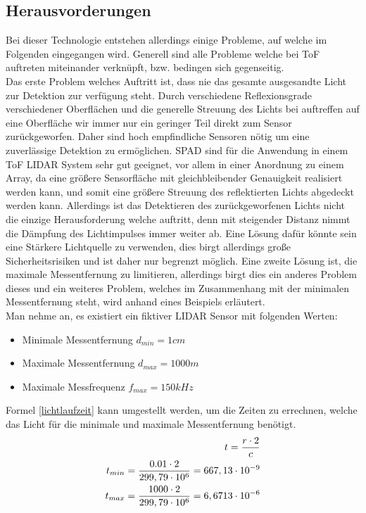 \subsection{Herausvorderungen}\label{subsec:tof_herausvorderungen}
Bei dieser Technologie entstehen allerdings einige Probleme, auf welche im Folgenden eingegangen wird. Generell sind alle Probleme welche bei \ac{ToF} auftreten miteinander verknüpft, bzw. bedingen sich gegenseitig. \\
Das erste Problem welches Auftritt ist, dass nie das gesamte ausgesandte Licht zur Detektion zur verfügung steht. Durch verschiedene Reflexionsgrade verschiedener Oberflächen und die generelle Streuung des Lichts bei auftreffen auf eine Oberfläche wir immer nur ein geringer Teil direkt zum Sensor zurückgeworfen. Daher sind hoch empfindliche Sensoren nötig um eine zuverlässige Detektion zu ermöglichen.
\ac{SPAD} sind für die Anwendung in einem \ac{ToF} \ac{LIDAR} System sehr gut geeignet, vor allem in einer Anordnung zu einem Array, da eine größere Sensorfläche mit gleichbleibender Genauigkeit realisiert werden kann, und somit eine größere Streuung des reflektierten Lichts abgedeckt werden kann. Allerdings ist das Detektieren des zurückgeworfenen Lichts nicht die einzige Herausforderung welche auftritt, denn mit steigender Distanz nimmt die Dämpfung des Lichtimpulses immer weiter ab. Eine Lösung dafür könnte sein eine Stärkere Lichtquelle zu verwenden, dies birgt allerdings große Sicherheitsrisiken und ist daher nur begrenzt möglich. Eine zweite Lösung ist, die maximale Messentfernung zu limitieren, allerdings birgt dies ein anderes Problem dieses und ein weiteres Problem, welches im Zusammenhang mit der minimalen Messentfernung steht, wird anhand eines Beispiels erläutert.\\
Man nehme an, es existiert ein fiktiver \ac{LIDAR} Sensor mit folgenden Werten:
\begin{itemize}
	\item Minimale Messentfernung $d_{min}=1cm$
	\item Maximale Messentfernung $d_{max}=1000m$
	\item Maximale Messfrequenz $f_{max}=150kHz$ 
\end{itemize}
Formel \ref{lichtlaufzeit} kann umgestellt werden, um die Zeiten zu errechnen, welche das Licht für die minimale und maximale Messentfernung benötigt. 
\begin{equation}\formelentry{Berechnung der minimalen und maximalen Zeit}
	\begin{split}
		t = \frac{r \cdot 2}{c}\\
		t_{min} = \frac{0.01 \cdot 2}{299,79 \cdot 10^6} = 667,13 \cdot 10^{-9}\\
		t_{max} = \frac{1000 \cdot 2}{299,79 \cdot 10^6} = 6,6713 \cdot 10^{-6}\\
	\end{split}
\end{equation} 
